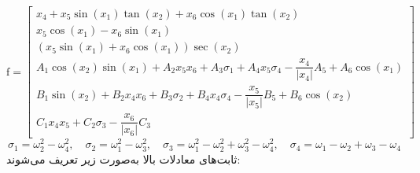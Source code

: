 \begin{equation}
\boldsymbol{\mathrm{f}} = \begin{bmatrix}
		x_4 + x_5\sin(x_1)\tan(x_2) + x_6\cos(x_1)\tan(x_2)\\
		x_5\cos(x_1)- x_6\sin(x_1)\\
		(x_5\sin(x_1) + x_6\cos(x_1))\sec(x_2)\\
		A_1\cos(x_2)\sin(x_1) + 
		A_2x_5x_6 + A_3\sigma_1+
		A_4x_5\sigma_4- \dfrac{x_4}{\lvert x_4\rvert}A_5+A_6\cos(x_1)\\
		B_1\sin(x_2) + 
		B_2x_4x_6 + B_3\sigma_2+
		B_4x_4\sigma_4- \dfrac{x_5}{\lvert x_5\rvert}B_5 + B_6\cos(x_2)\\
		C_1x_4x_5 + 
		C_2\sigma_3- \dfrac{x_6}{\lvert x_6\rvert}C_3
	\end{bmatrix}
\end{equation} 
\begin{equation*}
	\sigma_1 = \omega_2^2-\omega_4^2,\quad \sigma_2 = \omega_1^2-\omega_3^2,
	\quad \sigma_3 = \omega_1^2-\omega_2^2+\omega_3^2-\omega_4^2,\quad \sigma_4 = \omega_1-\omega_2+\omega_3-\omega_4
\end{equation*}
ثابت‌های معادلات بالا  به‌صورت زیر تعریف می‌شوند:
